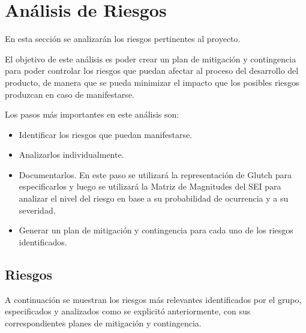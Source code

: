 \section{An\'alisis de Riesgos}

En esta secci\'on se analizar\'an los riesgos pertinentes al proyecto.

El objetivo de este an\'alisis es poder crear un plan de mitigaci\'on y contingencia para poder controlar los riesgos que puedan afectar al proceso del desarrollo del producto, de manera que se pueda minimizar el impacto que los posibles riesgos produzcan en caso de manifestarse.

Los pasos m\'as importantes en este an\'alisis son:

\begin{itemize}
\item Identificar los riesgos que puedan manifestarse.
\item Analizarlos individualmente.
\item Documentarlos. En este paso se utilizar\'a la representaci\'on de Glutch para especificarlos y luego se utilizar\'a la Matriz de Magnitudes del SEI para analizar el nivel del riesgo en base a su probabilidad de ocurrencia y a su severidad.
\item Generar un plan de mitigaci\'on y contingencia para cada uno de los riesgos identificados.
\end{itemize}


\subsection{Riesgos}


A continuaci\'on se muestran los riesgos m\'as relevantes identificados por el grupo, especificados y analizados como se explicit\'o anteriormente, con sus correspondientes planes de mitigación y contingencia.

